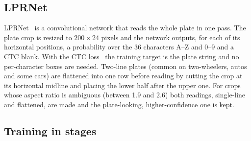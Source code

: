 \subsection{LPRNet}

LPRNet~\cite{zherzdev2018lprnet} is a convolutional network that reads the whole
plate in one pass. The plate crop is resized to $200\times24$ pixels and the
network outputs, for each of its horizontal positions, a probability over the 36
characters A--Z and 0--9 and a CTC blank. With the CTC loss~\cite{graves2006ctc}
the training target is the plate string and no per-character boxes are needed.
Two-line plates (common on two-wheelers, autos and some cars) are flattened
into one row before reading by cutting the crop at its horizontal midline and
placing the lower half after the upper one. For crops whose aspect ratio is
ambiguous (between 1.9 and 2.6) both readings, single-line and flattened, are
made and the plate-looking, higher-confidence one is kept.

\subsection{Training in stages}


